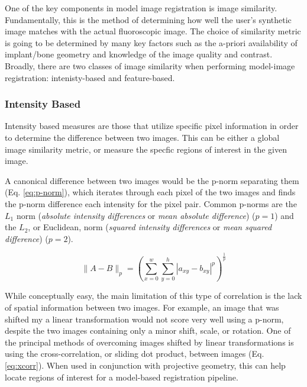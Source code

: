 One of the key components in model image registration is image similarity. Fundamentally, this is the method of determining how well the user's synthetic image matches with the actual fluoroscopic image. The choice of similarity metric is going to be determined by many key factors such as the a-priori availability of implant/bone geometry and knowledge of the image quality and contrast. Broadly, there are two classes of image similarity when performing model-image registration: intenisty-based and feature-based.

\subsubsection{Intensity Based}
Intensity based measures are those that utilize specific pixel information in order to determine the difference between two images. This can be either a global image similarity metric, or measure the specfic regions of interest in the given image. 

A canonical difference between two images would be the p-norm separating them (Eq. \ref{eq:p-norm}), which iterates through each pixel of the two images and finds the p-norm difference each intensity for the pixel pair. Common p-norms are the $L_1$ norm (\emph{absolute intensity differences} or \emph{mean absolute difference}) \cite{kanadeStereoMatchingAlgorithm1994} ($p=1$) and the $L_{2}$, or Euclidean, norm (\emph{squared intensity differences} or \emph{mean squared difference}) \cite{hannahComputerMatchingAreas1977}($p=2$).

\begin{equation}
    \|A-B\|_{p} = (\sum_{x=0}^{w}\sum_{y=0}^{h}|a_{xy}-b_{xy}|^{p})^{\frac{1}{p}}
    \label{eq:p-norm}
\end{equation}

While conceptually easy, the main limitation of this type of correlation is the lack of spatial information between two images. For example, an image that was shifted my a linear transformation would not score very well using a p-norm, despite the two images containing only a minor shift, scale, or rotation. One of the principal methods of overcoming images shifted by linear transformations is using the cross-correlation, or sliding dot product, between images \cite{bendatRandomDataAnalysis2010,hannahComputerMatchingAreas1977} (Eq. \ref{eq:xcorr}). When used in conjunction with projective geometry, this can help locate regions of interest for a model-based registration pipeline.

